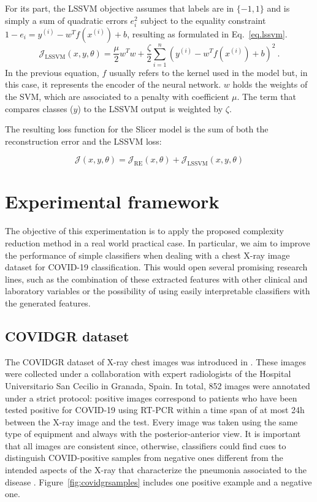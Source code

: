 \documentclass[
	fontsize=11pt, %
	twoside=false, %
	open=any, %
	secnumdepth=1, %
]{kaobook}
\begin{document}
For its part, the LSSVM objective assumes that labels are in $\{-1,1\}$ and is simply a sum of quadratic errors $e_i^2$ subject to the equality constraint $1-e_i=y^{(i)}-w^Tf\left(x^{(i)}\right)+b$, resulting as formulated in Eq.~\ref{eq.lssvm}.
\begin{equation}\label{eq.lssvm}
    \mathcal J_{\mbox{LSSVM}}(x,y,\theta)=\frac\mu 2w^Tw+\frac \zeta 2\sum_{i=1}^n \left(y^{(i)}-w^Tf\left(x^{(i)}\right)+b\right)^2~.
\end{equation}
In the previous equation, $f$ usually refers to the kernel used in the model but, in this case, it represents the encoder of the neural network. $w$ holds the weights of the SVM, which are associated to a penalty with coefficient $\mu$. The term that compares classes ($y$) to the LSSVM output is weighted by $\zeta$.

The resulting loss function for the Slicer model is the sum of both the reconstruction error and the LSSVM loss:

\begin{equation}
    \mathcal{J}(x,y,\theta)=\mathcal J_{\mbox{RE}}(x,\theta)+\mathcal J_{\mbox{LSSVM}}(x,y,\theta)
\end{equation}

\section{Experimental framework}\label{sec.exp}

The objective of this experimentation is to apply the proposed complexity reduction method in a real world practical case. In particular, we aim to improve the performance of simple classifiers when dealing with a chest X-ray image dataset for COVID-19 classification. This would open several promising research lines, such as the combination of these extracted features with other clinical and laboratory variables or the possibility of using easily interpretable classifiers with the generated features.

\subsection{COVIDGR dataset}

The COVIDGR dataset of X-ray chest images was introduced in \cite{9254002}. These images were collected under a collaboration with expert radiologists of the Hospital Universitario San Cecilio in Granada, Spain. In total, 852 images were annotated under a strict protocol: positive images correspond to patients who have been tested positive for COVID-19 using RT-PCR within a time span of at most 24h between the X-ray image and the test. Every image was taken using the same type of equipment and always with the posterior-anterior view. It is important that all images are consistent since, otherwise, classifiers could find cues to distinguish COVID-positive samples from negative ones different from the intended aspects of the X-ray that characterize the pneumonia associated to the disease \cite{MAGUOLO20211}. Figure~\ref{fig:covidgrsamples} includes one positive example and a negative one. 
\end{document}
